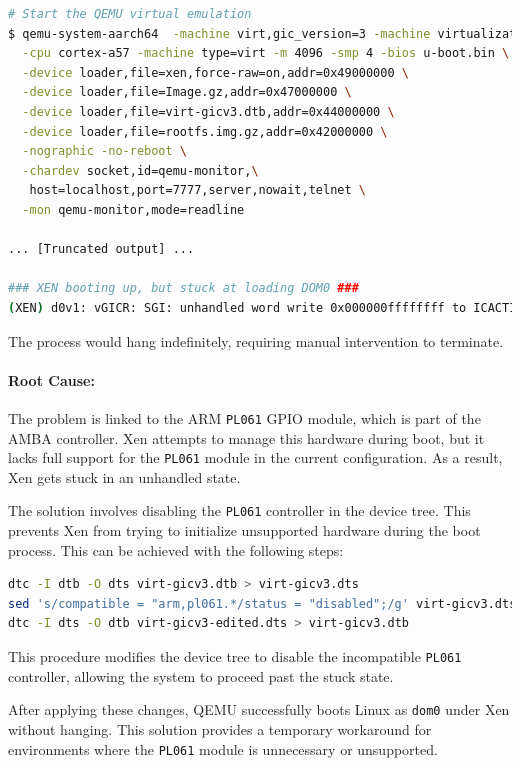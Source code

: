 \documentclass[acmtog]{acmart}
\begin{document}
\begin{lstlisting}[language=bash, caption=QEMU stuck on unsupported GPIO module]
# Start the QEMU virtual emulation
$ qemu-system-aarch64  -machine virt,gic_version=3 -machine virtualization=true \
  -cpu cortex-a57 -machine type=virt -m 4096 -smp 4 -bios u-boot.bin \
  -device loader,file=xen,force-raw=on,addr=0x49000000 \
  -device loader,file=Image.gz,addr=0x47000000 \
  -device loader,file=virt-gicv3.dtb,addr=0x44000000 \
  -device loader,file=rootfs.img.gz,addr=0x42000000 \
  -nographic -no-reboot \
  -chardev socket,id=qemu-monitor,\
   host=localhost,port=7777,server,nowait,telnet \
  -mon qemu-monitor,mode=readline

... [Truncated output] ...

### XEN booting up, but stuck at loading DOM0 ###
(XEN) d0v1: vGICR: SGI: unhandled word write 0x000000ffffffff to ICACTIVER0
\end{lstlisting}

The process would hang indefinitely, requiring manual intervention to terminate.

\paragraph{Root Cause:}The problem is linked to the ARM \texttt{PL061} GPIO module, which is part of the AMBA controller. Xen attempts to manage this hardware during boot, but it lacks full support for the \texttt{PL061} module in the current configuration. As a result, Xen gets stuck in an unhandled state.

The solution involves disabling the \texttt{PL061} controller in the device tree. This prevents Xen from trying to initialize unsupported hardware during the boot process. This can be achieved with the following steps:

\begin{lstlisting}[language=bash, caption=Solution to QEMU stuck]
dtc -I dtb -O dts virt-gicv3.dtb > virt-gicv3.dts
sed 's/compatible = "arm,pl061.*/status = "disabled";/g' virt-gicv3.dts > virt-gicv3-edited.dts
dtc -I dts -O dtb virt-gicv3-edited.dts > virt-gicv3.dtb
\end{lstlisting}

This procedure modifies the device tree to disable the incompatible \texttt{PL061} controller, allowing the system to proceed past the stuck state.

After applying these changes, QEMU successfully boots Linux as \texttt{dom0} under Xen without hanging. This solution provides a temporary workaround for environments where the \texttt{PL061} module is unnecessary or unsupported.
\end{document}
